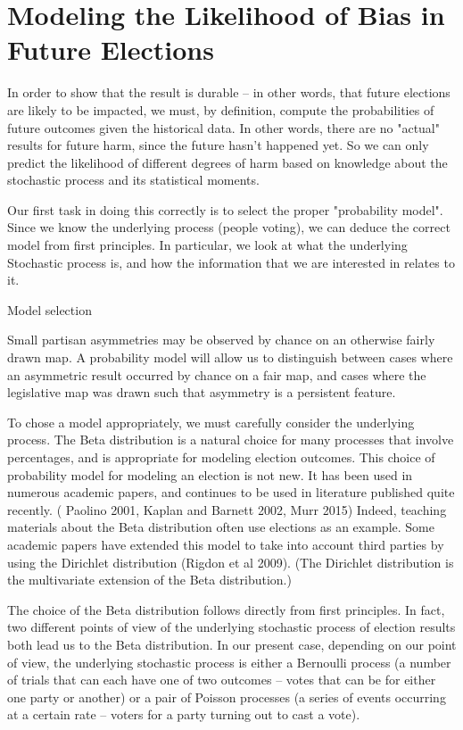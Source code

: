 \documentclass[preprint,12pt]{article}
\begin{document}
\section{Modeling the Likelihood of Bias in Future Elections\label{sec:FB}}
 
In order to show that the result is durable -- in other words, that future elections are likely to be impacted, we must, by definition, compute the probabilities of future outcomes given the historical data.  In other words, there are no "actual" results for future harm, since the future hasn't happened yet.  So we can only predict the likelihood of different degrees of harm based on knowledge about the stochastic process and its statistical moments.
 
Our first task in doing this correctly is to select the proper "probability model".  Since we know the underlying process (people voting), we can deduce the correct model from first principles.  In particular, we look at what the underlying Stochastic process is, and how the information that we are interested in relates to it.
 
Model selection
 
Small partisan asymmetries may be observed by chance on an otherwise fairly drawn map. A probability model will allow us to distinguish between cases where an asymmetric result occurred by chance on a fair map, and cases where the legislative map was drawn such that asymmetry is a persistent feature. 
 
To chose a model appropriately, we must carefully consider the underlying process. The Beta distribution is a natural choice for many processes that involve percentages, and is appropriate for modeling election outcomes. This choice of probability model for modeling an election is not new. It has been used in numerous academic papers, and continues to be used in literature published quite recently. ( Paolino 2001, Kaplan and Barnett 2002, Murr 2015)  Indeed, teaching materials about the Beta distribution often use elections as an example.  Some academic papers have extended this model to take into account third parties by using the Dirichlet distribution (Rigdon et al 2009).  (The Dirichlet distribution is the multivariate extension of the Beta distribution.) 
 
The choice of the Beta distribution follows directly from first principles. In fact, two different points of view of the underlying stochastic process of election results both lead us to the Beta distribution. In our present case, depending on our point of view, the underlying stochastic process is either a Bernoulli process (a number of trials that can each have one of two outcomes -- votes that can be for either one party or another) or a pair of Poisson processes (a series of events occurring at a certain rate -- voters for a party turning out to cast a vote).  
 
\end{document}
